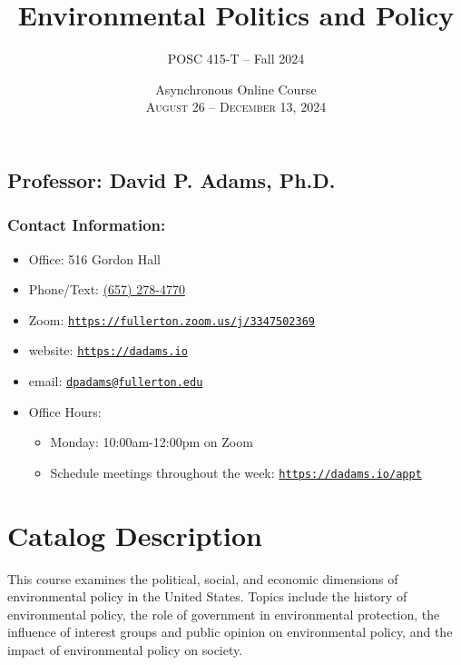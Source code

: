 \documentclass[12pt, letterpaper]{article}
\begin{document}
\title{\textbf{Environmental Politics and Policy}}

\author{POSC 415-T -- Fall 2024}
\date{Asynchronous Online Course \\ \textsc{August 26 -- December 13, 2024}}

    \maketitle


\subsection*{Professor: David P. Adams, Ph.D.}

\subsubsection*{Contact Information:}

\begin{itemize}
	\item Office: 516 Gordon Hall
	\item Phone/Text: \href{tel:+16572784770}{(657) 278-4770}
	\item Zoom: \href{https://fullerton.zoom.us/j/3347502369}{\texttt{https://fullerton.zoom.us/j/3347502369}}
	\item website: \href{https://dadams.io}{\texttt{https://dadams.io}}
	\item email: \href{dpadams@fullerton.edu}{\texttt{dpadams@fullerton.edu}}
	\item Office Hours:
        \begin{itemize}
            \item Monday: 10:00am-12:00pm on Zoom
            \item Schedule meetings throughout the week: \href{https://dadams.io/appt}{\texttt{https://dadams.io/appt}}
        \end{itemize}  
\end{itemize}



\section*{Catalog Description}

This course examines the political, social, and economic dimensions of environmental policy in the United States. Topics include the history of environmental policy, the role of government in environmental protection, the influence of interest groups and public opinion on environmental policy, and the impact of environmental policy on society.
\end{document}
